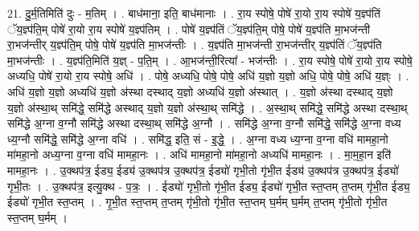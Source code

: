 \documentclass[17pt]{extarticle}
\begin{document}
21. दु॒र्म॒तिमिति॑ दुः - म॒तिम् । . बाध॑माना॒ इति॒ बाध॑मानाः । . रा॒य स्पोषे॒ पोषे॑ रा॒यो रा॒य स्पोषे॑ य॒ज्ञ्प॑तिं ॅय॒ज्ञ्प॑ति॒म् पोषे॑ रा॒यो रा॒य स्पोषे॑ य॒ज्ञ्प॑तिम् । . पोषे॑ य॒ज्ञ्प॑तिं ॅय॒ज्ञ्प॑ति॒म् पोषे॒ पोषे॑ य॒ज्ञ्प॑ति मा॒भज॑न्ती रा॒भज॑न्तीर् य॒ज्ञ्प॑ति॒म् पोषे॒ पोषे॑ य॒ज्ञ्प॑ति मा॒भज॑न्तीः । . य॒ज्ञ्प॑ति मा॒भज॑न्ती रा॒भज॑न्तीर् य॒ज्ञ्प॑तिं ॅय॒ज्ञ्प॑ति मा॒भज॑न्तीः । . य॒ज्ञ्प॑ति॒मिति॑ य॒ज्ञ् - प॒ति॒म् । . आ॒भज॑न्ती॒रित्या᳚ - भज॑न्तीः । . रा॒य स्पोषे॒ पोषे॑ रा॒यो रा॒य स्पोषे॒ अध्यधि॒ पोषे॑ रा॒यो रा॒य स्पोषे॒ अधि॑ । . पोषे॒ अध्यधि॒ पोषे॒ पोषे॒ अधि॑ य॒ज्ञो य॒ज्ञो अधि॒ पोषे॒ पोषे॒ अधि॑ य॒ज्ञ्ः । . अधि॑ य॒ज्ञो य॒ज्ञो अध्यधि॑ य॒ज्ञो अ॑स्था दस्थाद् य॒ज्ञो अध्यधि॑ य॒ज्ञो अ॑स्थात् । . य॒ज्ञो अ॑स्था दस्थाद् य॒ज्ञो य॒ज्ञो अ॑स्था॒थ् समि॑द्धे॒ समि॑द्धे अस्थाद् य॒ज्ञो य॒ज्ञो अ॑स्था॒थ् समि॑द्धे । . अ॒स्था॒थ् समि॑द्धे॒ समि॑द्धे अस्था दस्था॒थ् समि॑द्धे अ॒ग्ना व॒ग्नौ समि॑द्धे अस्था दस्था॒थ् समि॑द्धे अ॒ग्नौ । . समि॑द्धे अ॒ग्ना व॒ग्नौ समि॑द्धे॒ समि॑द्धे अ॒ग्ना वध्य ध्य॒ग्नौ समि॑द्धे॒ समि॑द्धे अ॒ग्ना वधि॑ । . समि॑द्ध॒ इति॒ सं - इ॒द्धे॒ । . अ॒ग्ना वध्य ध्य॒ग्ना व॒ग्ना वधि॑ मामहा॒नो मा॑महा॒नो अध्य॒ग्ना व॒ग्ना वधि॑ मामहा॒नः । . अधि॑ मामहा॒नो मा॑महा॒नो अध्यधि॑ मामहा॒नः । . मा॒म॒हा॒न इति॑ मामहा॒नः । . उ॒क्थप॑त्र॒ ईड्य॒ ईड्य॑ उ॒क्थप॑त्र उ॒क्थप॑त्र॒ ईड्यो॑ गृभी॒तो गृ॑भी॒त ईड्य॑ उ॒क्थप॑त्र उ॒क्थप॑त्र॒ ईड्यो॑ गृभी॒तः । . उ॒क्थप॑त्र॒ इत्यु॒क्थ - प॒त्रः॒ । . ईड्यो॑ गृभी॒तो गृ॑भी॒त ईड्य॒ ईड्यो॑ गृभी॒त स्त॒प्तम् त॒प्तम् गृ॑भी॒त ईड्य॒ ईड्यो॑ गृभी॒त स्त॒प्तम् । . गृ॒भी॒त स्त॒प्तम् त॒प्तम् गृ॑भी॒तो गृ॑भी॒त स्त॒प्तम् घ॒र्मम् घ॒र्मम् त॒प्तम् गृ॑भी॒तो गृ॑भी॒त स्त॒प्तम् घ॒र्मम् । \newline
\end{document}
